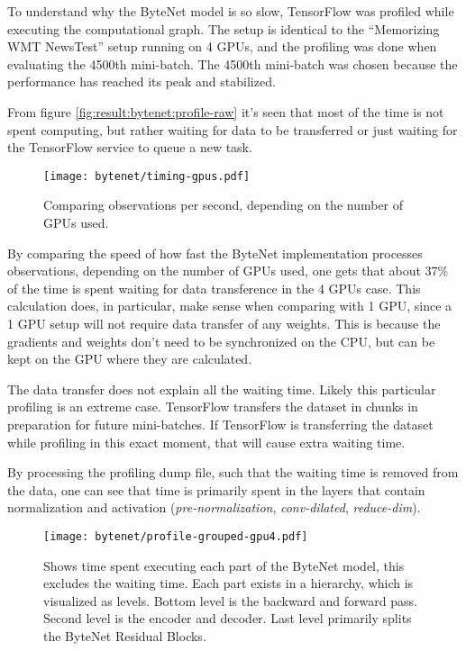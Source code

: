 To understand why the ByteNet model is so slow, TensorFlow was profiled while executing the computational graph. The setup is identical to the ``Memorizing WMT NewsTest'' setup running on 4 GPUs, and the profiling was done when evaluating the 4500th mini-batch. The 4500th mini-batch was chosen because the performance has reached its peak and stabilized.

From figure \ref{fig:result:bytenet:profile-raw} it's seen that most of the time is not spent computing, but rather waiting for data to be transferred or just waiting for the TensorFlow service to queue a new task.

\begin{figure}[h]
    \centering
    \texttt{[image: bytenet/timing-gpus.pdf]}
    \caption{Comparing observations per second, depending on the number of GPUs used.}
    \label{fig:result:bytenet:timing-gpus}
\end{figure}

By comparing the speed of how fast the ByteNet implementation processes observations, depending on the number of GPUs used, one gets that about 37\% of the time is spent waiting for data transference in the 4 GPUs case. This calculation does, in particular, make sense when comparing with 1 GPU, since a 1 GPU setup will not require data transfer of any weights. This is because the gradients and weights don't need to be synchronized on the CPU, but can be kept on the GPU where they are calculated.

The data transfer does not explain all the waiting time. Likely this particular profiling is an extreme case. TensorFlow transfers the dataset in chunks in preparation for future mini-batches. If TensorFlow is transferring the dataset while profiling in this exact moment, that will cause extra waiting time.

By processing the profiling dump file, such that the waiting time is removed from the data, one can see that time is primarily spent in the layers that contain normalization and activation (\textit{pre-normalization}, \textit{conv-dilated}, \textit{reduce-dim}).

\begin{figure}[h]
    \centering
    \texttt{[image: bytenet/profile-grouped-gpu4.pdf]}
    \caption{Shows time spent executing each part of the ByteNet model, this excludes the waiting time. Each part exists in a hierarchy, which is visualized as levels. Bottom level is the backward and forward pass. Second level is the encoder and decoder. Last level primarily splits the ByteNet Residual Blocks.}
    \label{fig:result:bytenet:profile-grouped}
\end{figure}

